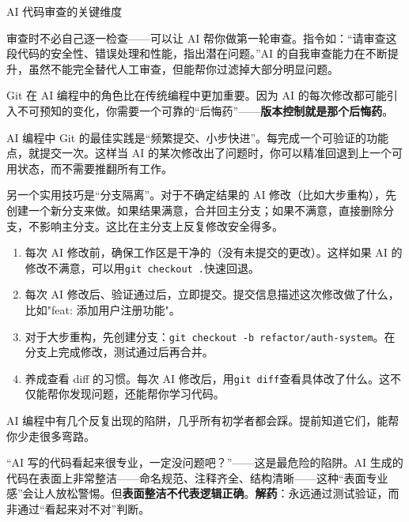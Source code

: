 \begin{center}\small\color{gray}AI 代码审查的关键维度\end{center}

审查时不必自己逐一检查——可以让 AI 帮你做第一轮审查。指令如：“请审查这段代码的安全性、错误处理和性能，指出潜在问题。”AI 的自我审查能力在不断提升，虽然不能完全替代人工审查，但能帮你过滤掉大部分明显问题。


Git 在 AI 编程中的角色比在传统编程中更加重要。因为 AI 的每次修改都可能引入不可预知的变化，你需要一个可靠的“后悔药”——\textbf{版本控制就是那个后悔药}。

AI 编程中 Git 的最佳实践是“频繁提交、小步快进”。每完成一个可验证的功能点，就提交一次。这样当 AI 的某次修改出了问题时，你可以精准回退到上一个可用状态，而不需要推翻所有工作。

另一个实用技巧是“分支隔离”。对于不确定结果的 AI 修改（比如大步重构），先创建一个新分支来做。如果结果满意，合并回主分支；如果不满意，直接删除分支，不影响主分支。这比在主分支上反复修改安全得多。

\begin{enumerate}
  \item 每次 AI 修改前，确保工作区是干净的（没有未提交的更改）。这样如果 AI 的修改不满意，可以用\texttt{git checkout .\allowbreak }快速回退。
  \item 每次 AI 修改后、验证通过后，立即提交。提交信息描述这次修改做了什么，比如"feat: 添加用户注册功能"。
  \item 对于大步重构，先创建分支：\texttt{git checkout -\allowbreak b refactor/\allowbreak auth-\allowbreak system}。在分支上完成修改，测试通过后再合并。
  \item 养成查看 diff 的习惯。每次 AI 修改后，用\texttt{git diff}查看具体改了什么。这不仅能帮你发现问题，还能帮你学习代码。
\end{enumerate}


AI 编程中有几个反复出现的陷阱，几乎所有初学者都会踩。提前知道它们，能帮你少走很多弯路。


“AI 写的代码看起来很专业，一定没问题吧？”——这是最危险的陷阱。AI 生成的代码在表面上非常整洁——命名规范、注释齐全、结构清晰——这种“表面专业感”会让人放松警惕。但\textbf{表面整洁不代表逻辑正确}。\textbf{解药}：永远通过测试验证，而非通过“看起来对不对”判断。


